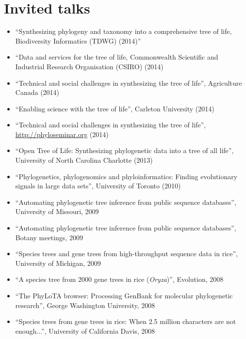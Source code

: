 \documentclass[10pt]{article}
\begin{document}
\section*{Invited talks}
\begin{itemize}
\item{``Synthesizing phylogeny and taxonomy into a comprehensive tree of life, Biodiversity Informatics (TDWG) (2014)''}
\item{``Data and services for the tree of life, Commonwealth Scientific and Industrial Research Organisation (CSIRO) (2014)}
\item{``Technical and social challenges in synthesizing the tree of life'', Agriculture Canada (2014)}
\item{``Enabling science with the tree of life'', Carleton University (2014)}
\item{``Technical and social challenges in synthesizing the tree of life'', \url{http://phyloseminar.org} (2014)}
\item{``Open Tree of Life: Synthesizing phylogenetic data into a tree of all life'', University of North Carolina Charlotte (2013)}
\item{``Phylogenetics, phylogenomics and phyloinformatics: Finding evolutionary signals in large data sets'', University of Toronto (2010)}
\item{``Automating phylogenetic tree inference from public sequence databases'', University of Missouri, 2009} 
\item{``Automating phylogenetic tree inference from public sequence databases'', Botany meetings, 2009} 
\item{``Species trees and gene trees from high-throughput sequence data in rice'', University of Michigan, 2009}
\item{``A species tree from 2000 gene trees in rice (\textit{Oryza})'', Evolution, 2008}
\item{``The PhyLoTA browser: Processing GenBank for molecular phylogenetic research'', George Washington University, 2008}
\item{``Species trees from gene trees in rice: When 2.5 million characters are not enough...'', University of California Davis, 2008}
\end{itemize}

\end{document}
